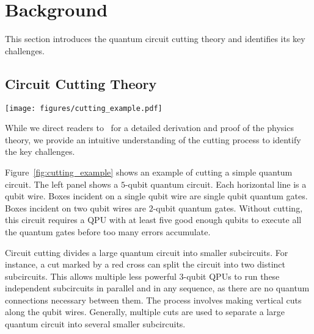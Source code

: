 \section{Background}\label{sec:background}
This section introduces the quantum circuit cutting theory and identifies its key challenges.

\subsection{Circuit Cutting Theory}
\begin{figure*}[t]
    \centering
    \texttt{[image: figures/cutting\_example.pdf]}
    \caption{Example of cutting a $5$-qubit quantum circuit with one cut to divide it into two smaller subcircuits.
    (Left) The red cross indicates the cutting point.
    Subcircuit $1$ is shaded dark and subcircuit $2$ is shaded light.
    (Right) The dashed arrow between the subcircuits shows the path undertaken by the qubit wire being cut.
    The one cut needs to permute through the $\{I,X,Y,Z\}$ bases to reconstruct the unknown cut state.
    The two subcircuits require no quantum communications can now be executed independently in any order on multiple $3$-qubit QPUs.}
    \label{fig:cutting_example}
\end{figure*}

While we direct readers to~\cite{peng2020simulating} for a detailed derivation and proof of the physics theory,
we provide an intuitive understanding of the cutting process to identify the key challenges.

Figure~\ref{fig:cutting_example} shows an example of cutting a simple quantum circuit.
The left panel shows a $5$-qubit quantum circuit.
Each horizontal line is a qubit wire.
Boxes incident on a single qubit wire are single qubit quantum gates.
Boxes incident on two qubit wires are $2$-qubit quantum gates.
Without cutting, this circuit requires a QPU with at least five good enough qubits to execute all the quantum gates before too many errors accumulate.

Circuit cutting divides a large quantum circuit into smaller subcircuits.
For instance, a cut marked by a red cross can split the circuit into two distinct subcircuits.
This allows multiple less powerful $3$-qubit QPUs to run these independent subcircuits in parallel and in any sequence,
as there are no quantum connections necessary between them.
The process involves making vertical cuts along the qubit wires.
Generally, multiple cuts are used to separate a large quantum circuit into several smaller subcircuits.

